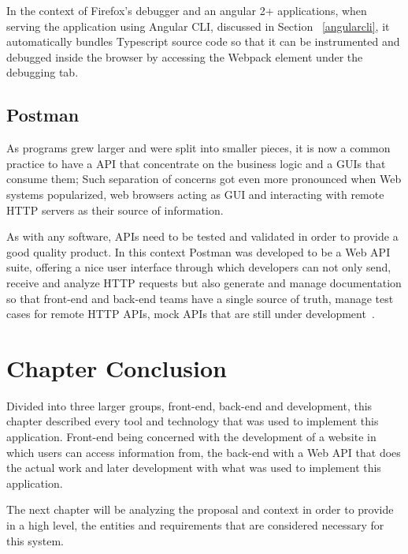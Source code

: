 In the context of Firefox's debugger and an angular 2+ applications, when serving the application using Angular \gls{CLI}, discussed in Section ~\ref{angularcli}, it automatically bundles Typescript source code so that it can be instrumented and debugged inside the browser by accessing the Webpack element under the debugging tab.

\subsection{Postman}
As programs grew larger and were split into smaller pieces, it is now a common practice to have a \gls{API} that concentrate on the business logic and a \gls{GUI}s that consume them; Such separation of concerns got even more pronounced when Web systems popularized, web browsers acting as \gls{GUI} and interacting with remote \gls{HTTP} servers as their source of information.

As with any software, \gls{API}s need to be tested and validated in order to provide a good quality product. In this context Postman was developed to be a Web \gls{API} suite, offering a nice user interface through which developers can not only send, receive and analyze \gls{HTTP} requests but also generate and manage documentation so that front-end and back-end teams have a single source of truth, manage test cases for remote \gls{HTTP} \gls{API}s, mock \gls{API}s that are still under development~\cite{postman}.

\section{Chapter Conclusion}

Divided into three larger groups, front-end, back-end and development, this chapter described every tool and technology that was used to implement this application. Front-end being concerned with the development of a website in which users can access information from, the back-end with a Web \gls{API} that does the actual work and later development with what was used to implement this application.

The next chapter will be analyzing the proposal and context in order to provide in a high level, the entities and requirements that are considered necessary for this system.
